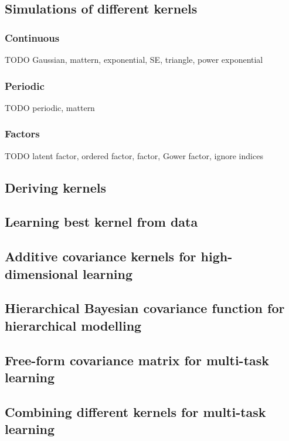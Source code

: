 \documentclass[10pt]{article}
\begin{document}
\subsection{Simulations of different kernels \cite{gaupro}}

\subsubsection{Continuous}
TODO Gaussian, mattern, exponential, SE, triangle, power exponential

\subsubsection{Periodic}
TODO periodic, mattern

\subsubsection{Factors}
TODO latent factor, ordered factor, factor, Gower factor, ignore indices


\subsection{Deriving kernels \cite{deriving-kernels}}


\subsection{Learning best kernel from data \cite{choosing-kernels}}


\subsection{Additive covariance kernels for high-dimensional learning \cite{additive-kernels}}


\subsection{Hierarchical Bayesian covariance function for hierarchical modelling \cite{hierarchical-kernels}}


\subsection{Free-form covariance matrix for multi-task learning \cite{freeform-kernels}}


\subsection{Combining different kernels for multi-task learning \cite{multi-kernels}}
\end{document}
